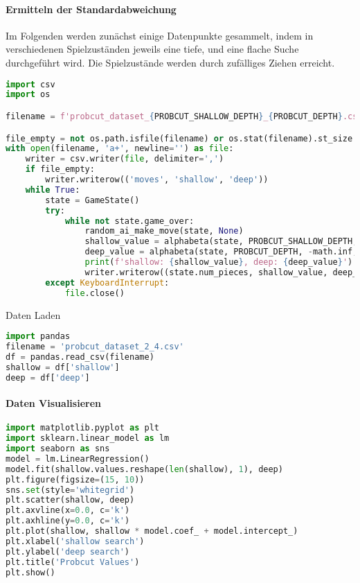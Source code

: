 \hypertarget{ermitteln-der-standardabweichung}{%
\paragraph{Ermitteln der
Standardabweichung}\label{ermitteln-der-standardabweichung}}

Im Folgenden werden zunächst einige Datenpunkte gesammelt, indem in
verschiedenen Spielzuständen jeweils eine tiefe, und eine flache Suche
durchgeführt wird. Die Spielzustände werden durch zufälliges Ziehen
erreicht.

\begin{lstlisting}[language=Python]
import csv
import os

filename = f'probcut_dataset_{PROBCUT_SHALLOW_DEPTH}_{PROBCUT_DEPTH}.csv'

file_empty = not os.path.isfile(filename) or os.stat(filename).st_size == 0
with open(filename, 'a+', newline='') as file:
    writer = csv.writer(file, delimiter=',')
    if file_empty:
        writer.writerow(('moves', 'shallow', 'deep'))
    while True:
        state = GameState()
        try:
            while not state.game_over:
                random_ai_make_move(state, None)
                shallow_value = alphabeta(state, PROBCUT_SHALLOW_DEPTH, -math.inf, math.inf, combined_heuristic)
                deep_value = alphabeta(state, PROBCUT_DEPTH, -math.inf, math.inf, combined_heuristic)
                print(f'shallow: {shallow_value}, deep: {deep_value}')
                writer.writerow((state.num_pieces, shallow_value, deep_value)) 
        except KeyboardInterrupt:
            file.close()
\end{lstlisting}

Daten Laden

\begin{lstlisting}[language=Python]
import pandas
filename = 'probcut_dataset_2_4.csv'
df = pandas.read_csv(filename)
shallow = df['shallow']
deep = df['deep']
\end{lstlisting}

\hypertarget{daten-visualisieren}{%
\paragraph{Daten Visualisieren}\label{daten-visualisieren}}

\begin{lstlisting}[language=Python]
import matplotlib.pyplot as plt
import sklearn.linear_model as lm
import seaborn as sns
model = lm.LinearRegression()
model.fit(shallow.values.reshape(len(shallow), 1), deep)
plt.figure(figsize=(15, 10))
sns.set(style='whitegrid')
plt.scatter(shallow, deep)
plt.axvline(x=0.0, c='k')
plt.axhline(y=0.0, c='k')
plt.plot(shallow, shallow * model.coef_ + model.intercept_)
plt.xlabel('shallow search')
plt.ylabel('deep search')
plt.title('Probcut Values')
plt.show()
\end{lstlisting}


